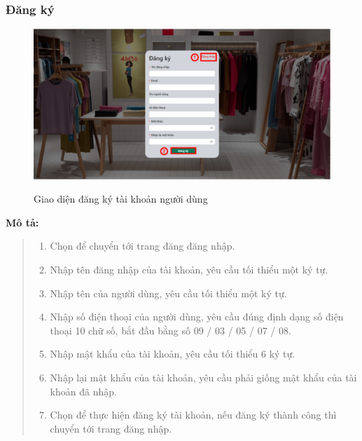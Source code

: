     \subsubsection{Đăng ký}
    \begin{figure}[!htp]
        \centering
        \includegraphics[width=5in]{img/UI/new_customer/register.png}
        \label{2}
        \newline
        \caption{Giao diện đăng ký tài khoản người dùng}
    \end{figure}
    \textbf{Mô tả:}  
    \begin{quote}
        \begin{enumerate}
            \item Chọn để chuyển tới trang đăng đăng nhập.
            \item Nhập tên đăng nhập của tài khoản, yêu cầu tối thiểu một ký tự.
            \item Nhập tên của người dùng, yêu cầu tối thiểu một ký tự.
            \item Nhập số điện thoại của người dùng, yêu cầu đúng định dạng số điện thoại 10 chữ số, bắt đầu bằng số 09 / 03 / 05 / 07 / 08.
            \item Nhập mật khẩu của tài khoản, yêu cầu tối thiểu 6 ký tự.
            \item Nhập lại mật khẩu của tài khoản, yêu cầu phải giống mật khẩu của tài khoản đã nhập.
            \item Chọn để thực hiện đăng ký tài khoản, nếu đăng ký thành công thì chuyển tới trang đăng nhập.
        \end{enumerate}
    \end{quote}
   
   
